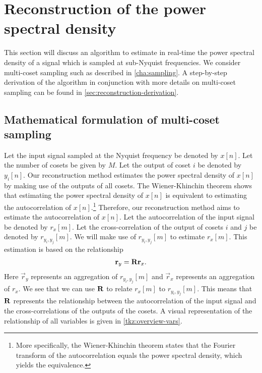 \documentclass[a4paper, openany, oneside]{memoir}
\begin{document}
\section{Reconstruction of the power spectral density}
\label{sec:reconstruction-algorithm}
This section will discuss an algorithm to estimate in real-time the power spectral density of a signal which is sampled at sub-Nyquist frequencies. We consider multi-coset sampling such as described in \cref{cha:sampling}. A step-by-step derivation of the algorithm in conjunction with more details on multi-coset sampling can be found in \cref{sec:reconstruction-derivation}.

\subsection{Mathematical formulation of multi-coset sampling}
Let the input signal sampled at the Nyquist frequency be denoted by $x[n]$. Let the number of cosets be given by $M$. Let the output of coset $i$ be denoted by $y_i[n]$. Our reconstruction method estimates the power spectral density of $x[n]$ by making use of the outputs of all cosets. The Wiener-Khinchin theorem shows that estimating the power spectral density of $x[n]$ is equivalent to estimating the autocorrelation of $x[n]$.\footnote{More specifically, the Wiener-Khinchin theorem states that the Fourier transform of the autocorrelation equals the power spectral density, which yields the equivalence.} Therefore, our reconstruction method aims to estimate the autocorrelation of $x[n]$. Let the autocorrelation of the input signal be denoted by $r_x[m]$. Let the cross-correlation of the output of cosets $i$ and $j$ be denoted by $r_{y_i,y_j}[m]$. We will make use of $r_{y_i,y_j}[m]$ to estimate $r_x[m]$. This estimation is based on the relationship
\begin{align*}
    \boldsymbol{\mathbf{r}}_{y} = \boldsymbol{\mathbf{R}} \boldsymbol{\mathbf{r}}_x.
\end{align*}
Here $\vec{r}_y$ represents an aggregation of $r_{y_i,y_j}[m]$ and $\vec{r}_x$ represents an aggregation of $r_x$. We see that we can use $\boldsymbol{\mathbf{R}}$ to relate $r_x[m]$ to $r_{y_i,y_j}[m]$. This means that $\boldsymbol{\mathbf{R}}$ represents the relationship between the autocorrelation of the input signal and the cross-correlations of the outputs of the cosets. A visual representation of the relationship of all variables is given in \cref{tkz:overview-vars}.
\end{document}
